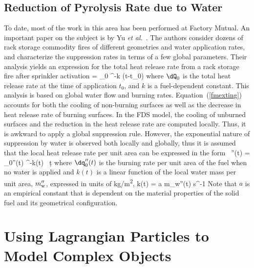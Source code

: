 \subsection{Reduction of Pyrolysis Rate due to Water}

To date, most of the work in this area has been performed at Factory Mutual. An important paper on the subject is by Yu {\em et al.}~\cite{Yu:1}. The authors consider dozens of rack storage commodity fires of different geometries and water application rates, and characterize the suppression rates in terms of a few global parameters. Their analysis yields an expression for the total heat release rate from a rack storage fire after sprinkler activation
\be
   \dQ = \dQ_0 \; ^{-k (t-t_0)}  \label{fmexting}
\ee
where $\dQ_0$ is the total heat release rate at the time of application $t_0$, and $k$ is a fuel-dependent constant. This analysis is based on global water flow and burning rates. Equation~(\ref{fmexting}) accounts for both the cooling of non-burning surfaces as well as the decrease in heat release rate of burning surfaces. In the FDS model, the cooling of unburned surfaces and the reduction in the heat release rate are computed locally. Thus, it is awkward to apply a global suppression rule. However, the exponential nature of suppression by water is observed both locally and globally, thus it is assumed that the local heat release rate per unit area can be expressed in the form~\cite{Hamins:1,Hamins:IAFSS2002}
\be
   \dq''(t) = \dq_0''(t) \; ^{-\int k(t) \, \d t}
\label{nistexting} \ee
where $\dq_0''(t)$ is the burning rate per unit area of the fuel when no water is applied and $k(t)$ is a linear function of the local water mass per unit area, $m_{\rm w}''$, expressed in units of \si{kg/m^2},
\be
   k(t) = a \; m_{\rm w}''(t) \quad   \hbox{s}^{-1}
\ee
Note that $a$ is an empirical constant that is dependent on the material properties of the solid fuel and its geometrical configuration.



\section{Using Lagrangian Particles to Model Complex Objects}
\label{rad_part_absorb}

